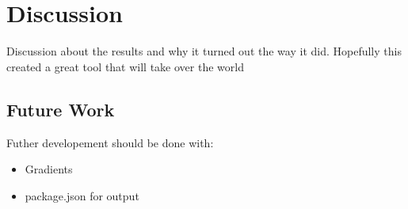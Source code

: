 \section{Discussion}
Discussion about the results and why it turned out the way it did. Hopefully this created a great tool that will take over the world

\subsection{Future Work}%
\label{sub:Future Work}
Futher developement should be done with:
\begin{itemize}
   \item Gradients
   \item package.json for output

\end{itemize}

